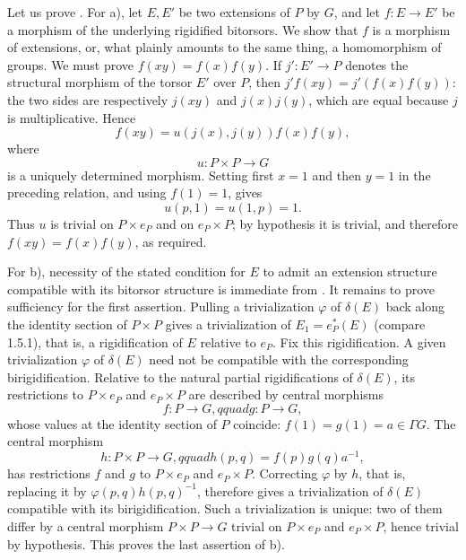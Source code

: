 Let us prove . For a), let $E,E'$ be two extensions of $P$ by $G$,
and let $f:E\longrightarrow E'$ be a morphism of the underlying
rigidified bitorsors. We show that $f$ is a morphism of extensions, or,
what plainly amounts to the same thing, a homomorphism of groups. We
must prove $f(xy)=f(x)f(y)$. If $j':E'\longrightarrow P$ denotes the
structural morphism of the torsor $E'$ over $P$, then
$j'f(xy)=j'(f(x)f(y))$: the two sides are respectively $j(xy)$ and
$j(x)j(y)$, which are equal because $j$ is multiplicative. Hence
\begin{equation*}
 f(xy)=u(j(x),j(y))f(x)f(y),
\end{equation*}
where
\begin{equation*}
 u:P\times P\longrightarrow G
\end{equation*}
is a uniquely determined morphism. Setting first $x=1$ and then $y=1$
in the preceding relation, and using $f(1)=1$, gives
\begin{equation*}
 u(p,1)=u(1,p)=1.
\end{equation*}
Thus $u$ is trivial on $P\times e_P$ and on $e_P\times P$; by
hypothesis it is trivial, and therefore $f(xy)=f(x)f(y)$, as required.

For b), necessity of the stated condition for $E$ to admit an
extension structure compatible with its bitorsor structure is immediate
from . It remains to prove sufficiency for the first assertion.
Pulling a trivialization $\varphi$ of $\delta(E)$ back along the
identity section of $P\times P$ gives a trivialization of
$E_1=e_P^*(E)$ (compare 1.5.1), that is, a rigidification of $E$
relative to $e_P$. Fix this rigidification. A given trivialization
$\varphi$ of $\delta(E)$ need not be compatible with the corresponding
birigidification. Relative to the natural partial rigidifications of
$\delta(E)$, its restrictions to $P\times e_P$ and $e_P\times P$ are
described by central morphisms
\begin{equation*}
 f:P\longrightarrow G,qquad g:P\longrightarrow G,
\end{equation*}
whose values at the identity section of $P$ coincide:
$f(1)=g(1)=a\in\Gamma G$. The central morphism
\begin{equation*}
 h:P\times P\longrightarrow G,qquad h(p,q)=f(p)g(q)a^{-1},
\end{equation*}
has restrictions $f$ and $g$ to $P\times e_P$ and $e_P\times P$.
Correcting $\varphi$ by $h$, that is, replacing it by
$\varphi(p,q)h(p,q)^{-1}$, therefore gives a trivialization of
$\delta(E)$ compatible with its birigidification. Such a trivialization
is unique: two of them differ by a central morphism
$P\times P\longrightarrow G$ trivial on $P\times e_P$ and
$e_P\times P$, hence trivial by hypothesis. This proves the last
assertion of  b).

